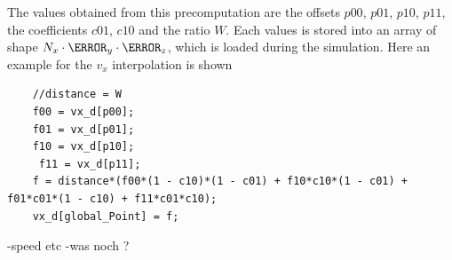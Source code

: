 The values obtained from this precomputation are the offsets  $p00$, $p01$, $p10$, $p11$, the coefficients $c01$, $c10$ and
the ratio $W$. Each values is stored into an array of shape $N_x\cdot \N_y \cdot \N_z$, which is loaded during the simulation.
Here an example for the $v_x$ interpolation is shown

\begin{verbatim}
    //distance = W
    f00 = vx_d[p00];
    f01 = vx_d[p01];
    f10 = vx_d[p10];
     f11 = vx_d[p11];
    f = distance*(f00*(1 - c10)*(1 - c01) + f10*c10*(1 - c01) + f01*c01*(1 - c10) + f11*c01*c10);
    vx_d[global_Point] = f;
\end{verbatim}

-speed etc
-was noch ?

\clearpage

